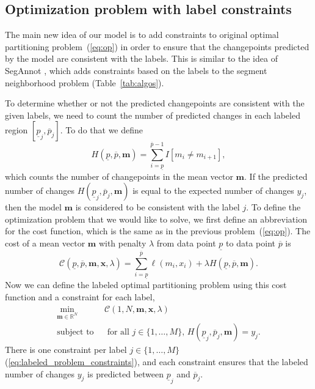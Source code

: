 \documentclass[12pt]{article}
\begin{document}
\subsection{Optimization problem with label constraints}

The main new idea of our model is to add constraints to original optimal partitioning problem~(\ref{eq:op}) in order to ensure that the changepoints predicted by the model are consistent with the labels. This is similar to the idea of SegAnnot \citep{Hocking2014}, which adds constraints based on the labels to the segment neighborhood problem (Table~\ref{tab:algos}).

To determine whether or not the predicted changepoints are consistent with the given labels, we need to count the number of predicted changes in each labeled region $[\underline p_j, \overline p_j]$. To do that we define 
$$
H(\underline p, \overline p, \mathbf m) =
\sum_{i=\underline p}^{\overline p-1}
    I[m_i \neq m_{i+1}],
$$
which counts the number of changepoints in the mean vector $\mathbf m$.
If the predicted number of changes $H(\underline p_j, \overline p_j, \mathbf m)$ is equal to the expected number of changes $y_j$, then the model $\mathbf m$ is considered to be consistent with the label $j$.
To define the optimization problem that we would like to solve, we first define an abbreviation for the cost function, which is the same as in the previous problem~(\ref{eq:op}). The cost of a mean vector $\mathbf m$ with penalty $\lambda$ from data point $\underline p$ to data point $\overline p$ is 
$$
    \mathcal C(\underline p, \overline p, \mathbf m, \mathbf x, \lambda) = 
    \sum_{i=\underline p}^{\overline p} 
    \ell(m_i, x_i) 
    +\lambda
    H(\underline p, \overline p, \mathbf m).
$$
Now we can define the labeled optimal partitioning problem using this cost function and a constraint for each label,
\begin{align}
 \min_{
  \mathbf m\in\mathbb R^{N}
  } &\ \ 
  \label{eq:labeled_problem_cost}
\mathcal C(1, N, \mathbf m, \mathbf x, \lambda)
\\
    \text{subject to} 
& \ \ \text{ for all } j\in\{1,\dots,M\},\, 
H(\underline p_j, \overline p_j, \mathbf m)=y_j.
\label{eq:labeled_problem_constraints}
\end{align}
There is one constraint per label $j\in\{1,\dots, M\}$ (\ref{eq:labeled_problem_constraints}),
and each constraint ensures that the labeled number of changes $y_j$ is predicted between $\underline p_j$ and $\overline p_j$.
\end{document}
